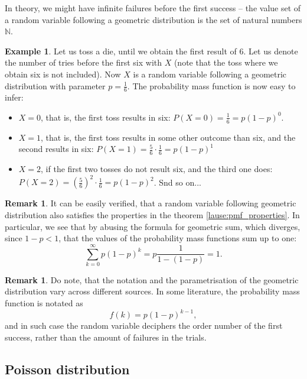 \documentclass[12pt,a4paper,leqno]{report}
\theoremstyle{plain}
\theoremstyle{definition}
\newtheorem{esim}[equation]{Example}
\newtheorem{remark}[equation]{Remark}
\begin{document}
In theory, we might have infinite failures before the first success -- the value set of a random variable following a geometric distribution is the set of natural numbers $\mathbb{N}$.

\begin{esim}
Let us toss a die, until we obtain the first result of $6$. Let us denote the number of tries before the first six with $X$ (note that the toss where we obtain six is not included). Now $X$ is a random variable following a geometric distribution with parameter $p = \frac{1}{6}$. The probability mass function is now easy to infer: 
\begin{itemize}
\item $X=0$, that is, the first toss results in six: $P(X=0) = \frac{1}{6} = p(1-p)^0$.
\item $X=1$, that is, the first toss results in some other outcome than six, and the second results in six: $P(X=1) = \frac{5}{6} \cdot \frac{1}{6} = p (1-p)^1$
\item $X=2$, if the first two tosses do not result six, and the third one does: $P(X=2) = \left(\frac{5}{6}\right)^2 \cdot \frac{1}{6} = p(1-p)^2$. Snd so on...
\end{itemize}
\end{esim}

\begin{remark}
It can be easily verified, that a random variable following geometric distribution also satisfies the properties in the theorem \ref{lause:pmf_properties}. In particular, we see that by abusing the formula for geometric sum, which diverges, since $1-p < 1$, that the values of the probability mass functions sum up to one:
\[
\sum_{k=0}^\infty p(1-p)^k = p \frac{1}{1- (1-p)} = 1.
\]
\end{remark}

\begin{remark}
Do note, that the notation and the parametrisation of the geometric distribution vary across different sources. In some literature, the probability mass function is notated as 
\[
f(k) = p(1-p)^{k-1},
\]
and in such case the random variable deciphers the order number of the first success, rather than the amount of failures in the trials.
\end{remark}

\subsection{Poisson distribution}
\end{document}
